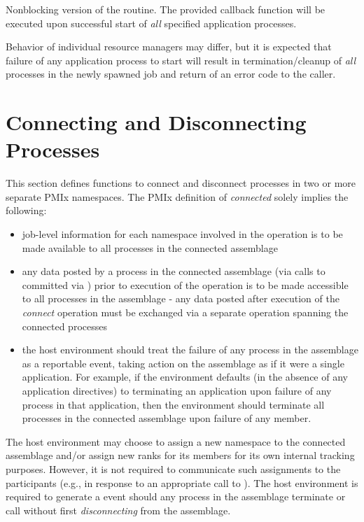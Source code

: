 \optattrend

\descr

Nonblocking version of the  routine. The provided callback function will be executed upon successful start of \textit{all} specified application processes.

\adviceuserstart
Behavior of individual resource managers may differ, but it is expected that failure of any application process to start will result in termination/cleanup of \emph{all} processes in the newly spawned job and return of an error code to the caller.
\adviceuserend



\section{Connecting and Disconnecting Processes}
\label{chap:api_proc_mgmt:connect}

This section defines functions to connect and disconnect processes in two or more separate \ac{PMIx} namespaces. The \ac{PMIx} definition of \textit{connected} solely implies the following:

\begin{itemize}
    \item job-level information for each namespace involved in the operation is to be made available to all processes in the connected assemblage
    \item any data posted by a process in the connected assemblage (via calls to  committed via ) prior to execution of the  operation is to be made accessible to all processes in the assemblage - any data posted after execution of the \textit{connect} operation must be exchanged via a separate  operation spanning the connected processes
    \item the host environment should treat the failure of any process in the assemblage as a reportable event, taking action on the assemblage as if it were a single application. For example, if the environment defaults (in the absence of any application directives) to terminating an application upon failure of any process in that application, then the environment should terminate all processes in the connected assemblage upon failure of any member.
\end{itemize}

\advicermstart
The host environment may choose to assign a new namespace to the connected assemblage and/or assign new ranks for its members for its own internal tracking purposes. However, it is not required to communicate such assignments to the participants (e.g., in response to an appropriate call to ). The host environment is required to generate a  event should any process in the assemblage terminate or call  without first \textit{disconnecting} from the assemblage.
\advicermend


